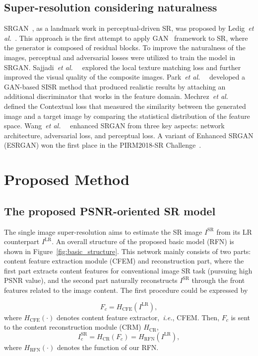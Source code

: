 \documentclass[preprint]{elsarticle}
\newcommand{\etal}{\textit{et al.~}}
\newcommand{\ie}{\textit{i.e.}}
\begin{document}
\subsection{Super-resolution considering naturalness}
SRGAN~\cite{SRGAN}, as a landmark work in perceptual-driven SR, was proposed by Ledig~\etal. This approach is the first attempt to apply GAN~\cite{GAN} framework to SR, where the generator is composed of residual blocks. To improve the naturalness of the images, perceptual and adversarial losses were utilized to train the model in SRGAN. Sajjadi~\etal~\cite{EnhanceNet} explored the local texture matching loss and further improved the visual quality of the composite images. Park~\etal~\cite{SRFeat} developed a GAN-based SISR method that produced realistic results by attaching an additional discriminator that works in the feature domain. Mechrez~\etal~\cite{CX} defined the Contextual loss that measured the similarity between the generated image and a target image by comparing the statistical distribution of the feature space. Wang~\etal~\cite{ESRGAN} enhanced SRGAN from three key aspects: network architecture, adversarial loss, and perceptual loss. A variant of Enhanced SRGAN (ESRGAN) won the first place in the PIRM2018-SR Challenge~\cite{PIRM-SR}.

\section{Proposed Method}\label{sec:proposed-method}
\subsection{The proposed PSNR-oriented SR model}
The single image super-resolution aims to estimate the SR image $I^\text{SR}$ from its LR counterpart ${I^\text{LR}}$. An overall structure of the proposed basic model (RFN) is shown in Figure~\ref{fig:basic_structure}. This network mainly consists of two parts: content feature extraction module (CFEM) and reconstruction part, where the first part extracts content features for conventional image SR task (pursuing high PSNR value), and the second part naturally reconstructs ${I^\text{SR}}$ through the front features related to the image content. The first procedure could be expressed by

\begin{equation}\label{eq:CFENet}
{F_c} = {H_\text{CFE}}\left( {{I^\text{LR}}} \right),
\end{equation}
where ${H_\text{CFE}\left(  \cdot  \right)}$ denotes content feature extractor,~\ie, CFEM. Then, ${F_c}$ is sent to the content reconstruction module (CRM) ${H_\text{CR}}$,
\begin{equation}\label{eq:CRNet}
{I_c^\text{SR}} = {H_\text{CR}}\left( {{F_c}} \right) = {H_\text{RFN}}\left( {{I^\text{LR}}} \right) ,
\end{equation}
where ${H_\text{RFN}\left( \cdot \right)}$ denotes the function of our RFN.
\end{document}
